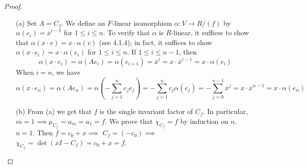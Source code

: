 \documentclass[11pt]{book}
\theoremstyle{definition}   \newtheorem{defn}[counter]{Definition} %
\newcommand{\ov}{\overline}   \newcommand{\wt}{\widetilde}
\DeclareMathOperator{\ra}{\rightarrow}   \DeclareMathOperator{\Poly}{\mathbf{P}}   \DeclareMathOperator{\spn}{\textnormal{span}}   \DeclareMathOperator{\aut}{\textnormal{Aut}}
\numberwithin{counter}{chapter}
\begin{document}
\begin{proof}\
\begin{enumerate}
\item[(a)] Set $A = C_f$. We define an $F$-linear isomorphism $\alpha : V \ra R/(f)$ by $\alpha(e_i) = \ov{x}^{i-1}$ for $1 \leq i \leq n$. To verify that $\alpha$ is $R$-linear, it suffices to show that $\alpha(x \cdot v) = x \cdot \alpha(v)$ (see 4.1.4); in fact, it suffices to show $\alpha(x \cdot e_i) = x \cdot \alpha(e_i)$ for $1 \leq i \leq n$. If $1 \leq i \leq n-1$, then
	\[\alpha(x \cdot e_i) = \alpha(A e_i) = \alpha(e_{i+1}) = \ov{x}^i = x \cdot \ov{x}^{i-1} = x \cdot \alpha(e_i) \]
When $i = n$, we have
	\[\alpha(x \cdot e_n) = \alpha(A e_n) = \alpha\left(-\sum_{j=1}^n c_j e_j \right) = -\sum_{j=1}^n c_j \alpha(e_j) = -\sum_{j=0}^{n-1} \ov{x}^j = x \cdot \ov{x}^{n-1} = x \cdot \alpha(e_n) \]

\item[(b)] From (a) we get that $f$ is the single invariant factor of $C_f$. In particular, $m = 1 \implies \mu_{C_f} = a_m = a_1 = f$. We prove that $\chi_{C_f} = f$ by induction on $n$. \\

$n = 1$. Then $f = c_0 + x \implies $ $C_f = (-c_0) \implies $ $\chi_{C_f} = \det(xI - C_f) = c_0 + x = f$. \\


\end{enumerate}
\end{proof}
\end{document}
